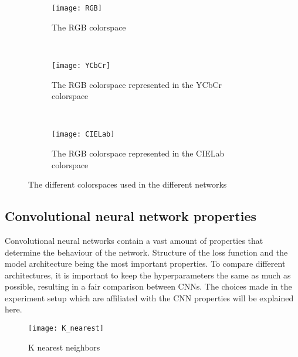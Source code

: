 \begin{figure}
	\centering
	\begin{subfigure}[b]{0.32\textwidth}
		\texttt{[image: RGB]}
		\caption{The RGB colorspace}
		\label{fig:RGB}
	\end{subfigure}
	~ %
	\begin{subfigure}[b]{0.32\textwidth}
		\texttt{[image: YCbCr]}
		\caption{The RGB colorspace represented in the YCbCr colorspace}
		\label{fig:YCbCr}
	\end{subfigure}
	~ %
	\begin{subfigure}[b]{0.32\textwidth}
		\texttt{[image: CIELab]}
		\caption{The RGB colorspace represented in the CIELab colorspace}
		\label{fig:CIELab}
	\end{subfigure}
	\caption{The different colorspaces used in the different networks}\label{fig:animals}
\end{figure}

\subsection{Convolutional neural network properties}
\label{sec:nnproperties}

Convolutional neural networks contain a vast amount of properties that determine the behaviour of the network. Structure of the loss function and the model architecture being the most important properties. To compare different architectures, it is important to keep the hyperparameters the same as much as possible, resulting in a fair comparison between CNNs. The choices made in the experiment setup which are affiliated with the CNN properties will be explained here.
\begin{wrapfigure}{R}{0.5\textwidth}
	\vspace{-20pt}
	\begin{center}
		\texttt{[image: K\_nearest]}
	\end{center}
	\caption{K nearest neighbors}
	\label{fig:knearest}
\end{wrapfigure}


